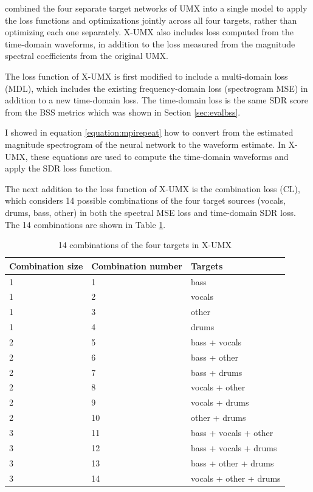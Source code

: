 \documentclass[report.tex]{subfiles}
\begin{document}
\textcite{xumx} combined the four separate target networks of UMX into a single model to apply the loss functions and optimizations jointly across all four targets, rather than optimizing each one separately. X-UMX also includes loss computed from the time-domain waveforms, in addition to the loss measured from the magnitude spectral coefficients from the original UMX.

The loss function of X-UMX is first modified to include a multi-domain loss (MDL), which includes the existing frequency-domain loss (spectrogram MSE) in addition to a new time-domain loss. The time-domain loss is the same SDR score from the BSS metrics which was shown in Section \ref{sec:evalbss}.

I showed in equation \eqref{equation:mpirepeat} how to convert from the estimated magnitude spectrogram of the neural network to the waveform estimate. In X-UMX, these equations are used to compute the time-domain waveforms and apply the SDR loss function.

The next addition to the loss function of X-UMX is the combination loss (CL), which considers 14 possible combinations of the four target sources (vocals, drums, bass, other) in both the spectral MSE loss and time-domain SDR loss. The 14 combinations are shown in Table \ref{table:14targets}.

\begin{table}[ht]
	\centering
	\caption{14 combinations of the four targets in X-UMX}
	\label{table:14targets}
	\begin{tabular}{ |l|l|l| }
	 \hline
		Combination size & Combination number & Targets \\
	 \hline
	 \hline
	 	1 & 1 & bass \\
	 \hline
	 	1 & 2 & vocals \\
	 \hline
	 	1 & 3 & other \\
	 \hline
	 	1 & 4 & drums \\
	 \hline
	 	2 & 5 & bass + vocals \\
	 \hline
	 	2 & 6 & bass + other \\
	 \hline
	 	2 & 7 & bass + drums \\
	 \hline
	 	2 & 8 & vocals + other \\
	 \hline
	 	2 & 9 & vocals + drums \\
	 \hline
	 	2 & 10 & other + drums \\
	 \hline
	 	3 & 11 & bass + vocals + other \\
	 \hline
	 	3 & 12 & bass + vocals + drums \\
	 \hline
	 	3 & 13 & bass + other + drums \\
	 \hline
	 	3 & 14 & vocals + other + drums \\
	 \hline
\end{tabular}
\end{table}
\end{document}
